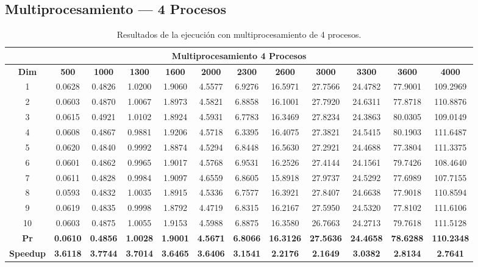 \documentclass{article}
\begin{document}

\subsection{Multiprocesamiento --- 4 Procesos}

\begin{table}[H]
\centering
\tiny
\begin{tabular}{|c|c|c|c|c|c|c|c|c|c|c|c|}
\hline
\multicolumn{12}{|c|}{\textbf{Multiprocesamiento 4 Procesos}} \\
\hline
\textbf{Dim} & \textbf{500} & \textbf{1000} & \textbf{1300} & \textbf{1600} & \textbf{2000} & \textbf{2300} & \textbf{2600} & \textbf{3000} & \textbf{3300} & \textbf{3600} & \textbf{4000} \\
\hline
1  & 0.0628 & 0.4826 & 1.0200 & 1.9060 & 4.5577 & 6.9276 & 16.5971 & 27.7566 & 24.4782 & 77.9001 & 109.2969 \\
2  & 0.0603 & 0.4870 & 1.0067 & 1.8973 & 4.5821 & 6.8858 & 16.1001 & 27.7920 & 24.6311 & 77.8718 & 110.8876 \\
3  & 0.0615 & 0.4921 & 1.0102 & 1.8924 & 4.5931 & 6.7783 & 16.3469 & 27.8234 & 24.3863 & 80.0305 & 109.0149 \\
4  & 0.0608 & 0.4867 & 0.9881 & 1.9206 & 4.5718 & 6.3395 & 16.4075 & 27.3821 & 24.5415 & 80.1903 & 111.6487 \\
5  & 0.0620 & 0.4840 & 0.9992 & 1.8874 & 4.5294 & 6.8448 & 16.5630 & 27.2921 & 24.4688 & 77.3804 & 111.3375 \\
6  & 0.0601 & 0.4862 & 0.9965 & 1.9017 & 4.5768 & 6.9531 & 16.2526 & 27.4144 & 24.1561 & 79.7426 & 108.4640 \\
7  & 0.0611 & 0.4828 & 0.9984 & 1.9097 & 4.6559 & 6.8605 & 15.8918 & 27.9737 & 24.5292 & 77.6989 & 107.7155 \\
8  & 0.0593 & 0.4832 & 1.0035 & 1.8915 & 4.5336 & 6.7577 & 16.3921 & 27.8407 & 24.6638 & 77.9018 & 110.8594 \\
9  & 0.0619 & 0.4835 & 0.9998 & 1.8792 & 4.4719 & 6.8315 & 16.2167 & 27.5950 & 24.5320 & 77.8102 & 111.6106 \\
10 & 0.0603 & 0.4875 & 1.0055 & 1.9153 & 4.5988 & 6.8875 & 16.3580 & 26.7663 & 24.2713 & 79.7618 & 111.5128 \\
\hline
\textbf{Pr} & \textbf{0.0610} & \textbf{0.4856} & \textbf{1.0028} & \textbf{1.9001} & \textbf{4.5671} & \textbf{6.8066} & \textbf{16.3126} & \textbf{27.5636} & \textbf{24.4658} & \textbf{78.6288} & \textbf{110.2348} \\
\hline
\textbf{Speedup} & \textbf{3.6118} & \textbf{3.7744} & \textbf{3.7014} & \textbf{3.6465} & \textbf{3.6406} & \textbf{3.1541} & \textbf{2.2176} & \textbf{2.1649} & \textbf{3.0382} & \textbf{2.8134} & \textbf{2.7641} \\
\hline
\end{tabular}
\caption{Resultados de la ejecución con multiprocesamiento de 4 procesos.}
\label{tab:mp4}
\end{table}
\end{document}
